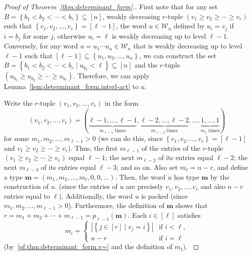\documentclass[reqno]{amsart}
\newcommand{\0}{\phantom{c}}
\newcommand{\mm}{\mathbf{m}}
\newcommand{\mcW}{\mathcal{W}}
\newenvironment{verlong}{}{}
\newenvironment{vershort}{}{}
\newcommand{\set}[1]{\left\{ #1 \right\}}
\newcommand{\abs}[1]{\left| #1 \right|}
\newcommand{\tup}[1]{\left( #1 \right)}
\newcommand{\ive}[1]{\left[ #1 \right]}
\theoremstyle{plain}
\theoremstyle{definition}
\numberwithin{equation}{section}
\begin{document}
\begin{proof}[Proof of Theorem~\ref{thm:determinant_form}.]
First note that for any set $B = \set{ b_1 < b_2 < \cdots < b_r }  \subseteq \ive{n}$, weakly decreasing $r$-tuple $\tup{v_1 \geq v_2 \geq \dotsm \geq v_r}$ such that $\set{ v_1, v_2, \dotsc, v_r } = \ive{\ell-1}$, the word $u \in \mcW_n$ defined by $u_i = v_j$ if $i = b_j$ for some $j$, otherwise $u_i = \ell$ is weakly decreasing up to level $\ell-1$.
Conversely, for any word $u = u_1 \dotsm u_n \in \mcW_n$ that is weakly decreasing up to level $\ell-1$ such that $\ive{\ell-1} \subseteq \set{u_1, u_2, \dotsc, u_n}$, we can construct the set $B = \set{ b_1 < b_2 < \cdots < b_r \mid u_{b_k} < \ell} \subseteq \ive{n}$ and the $r$-tuple $\tup{u_{b_1} \geq u_{b_2} \geq \cdots \geq u_{b_r}}$.
Therefore, we can apply Lemma~\ref{lem:determinant_form.interl-act} to $u$.

Write the $r$-tuple $\tup{v_1, v_2, \dotsc, v_r}$ in the form
\begin{equation}
\label{pf.thm:determinant_form.v=}
\tup{v_1, v_2, \dotsc, v_r} = (
  \underbrace{\ell-1,\ldots,\ell-1}_{m_{\ell-1}\text{ times}},
  \underbrace{\ell-2,\ldots,\ell-2}_{m_{\ell-2}\text{ times}},
  \dotsc,
  \underbrace{1,\ldots,1}_{m_1\text{ times}}
)
\end{equation}
for some $m_1, m_2, \ldots, m_{\ell-1} > 0$
(we can do this, since $\set{v_1, v_2, \dotsc, v_r} = \ive{\ell-1}$ and $v_1 \geq v_2 \geq \cdots \geq v_r$).
\begin{verlong}
Thus, the first $m_{\ell-1}$ of the entries of the $r$-tuple $\tup{v_1 \geq v_2 \geq \cdots \geq v_r}$ equal $\ell-1$; the next $m_{\ell-2}$ of its entries equal $\ell-2$; the next $m_{\ell-3}$ of its entries equal $\ell-3$; and so on.
\end{verlong}
Also set $m_{\ell} = n - r$, and define a type $\mm = \tup{m_1, m_2, \dotsc, m_{\ell}, 0, 0, \ldots}$.
Then, the word $u$ has type $\mm$
\begin{vershort}
by the construction of $u$.
\end{vershort}
\begin{verlong}
(since the entries of $u$ are precisely $v_1, v_2, \dotsc, v_r$ and also $n-r$ entries equal to $\ell$).
\end{verlong}
Additionally, the word $u$ is packed (since $m_1, m_2, \ldots, m_{\ell-1} > 0$).
Furthermore, the definition of $\mm$ shows that $r = m_1 + m_2 + \cdots + m_{\ell-1} = p_{\ell-1}(\mm)$.
\begin{verlong}
Each $i \in \ive{\ell}$ satisfies
\[
m_i =
  \begin{cases}
  \abs{ \set{ j \in \ive{r} \mid v_j = i}} & \text{if } i < \ell,\\
  n - r & \text{if } i = \ell
  \end{cases}
\]
(by~\eqref{pf.thm:determinant_form.v=} and the definition of $m_{\ell}$).
\end{verlong}


\end{proof}
\end{document}

